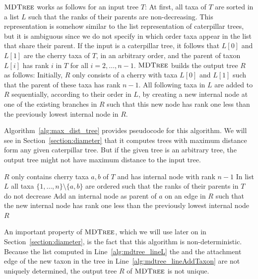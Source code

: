 \documentclass{amsart}
\newcommand{\mdtree}{\textsc{MDTree}}
\begin{document}
$\mdtree$ works as follows for an input tree $T$:
At first, all taxa of $T$ are sorted in a list $L$ such that the ranks of their parents are non-decreasing.
This representation is somehow similar to the list representation of caterpillar trees, but it is ambiguous since we do not specify in which order taxa appear in the list that share their parent.
If the input is a caterpillar tree, it follows that $L[0]$ and $L[1]$ are the cherry taxa of $T$, in an arbitrary order, and the parent of taxon $L[i]$ has rank $i$ in $T$ for all $i = 2, \ldots, n-1$.
$\mdtree$ builds the output tree $R$ as follows:
Initially, $R$ only consists of a cherry with taxa $L[0]$ and $L[1]$ such that the parent of these taxa has rank $n-1$.
All following taxa in $L$ are added to $R$ sequentially, according to their order in $L$, by creating a new internal node at one of the existing branches in $R$ such that this new node has rank one less than the previously lowest internal node in $R$.

Algorithm~\ref{alg:max_dist_tree} provides pseudocode for this algorithm.
We will see in Section~\ref{section:diameter} that it computes trees with maximum distance form any given caterpillar tree.
But if the given tree is an arbitrary tree, the output tree might not have maximum distance to the input tree.

\begin{algorithm}[H]
\caption{$\mdtree(T)$}
\label{alg:max_dist_tree}
\begin{algorithmic}[1]
	\STATE $R$ only contains cherry taxa $a, b$ of $T$ and has internal node with rank $n-1$
    \STATE In list $L$ all taxa $\{1,\ldots,n\}\setminus\{a,b\}$ are ordered such that the ranks of their parents in $T$ do not decrease \label{alg:mdtree_lineL}
		\STATE Add an internal node as parent of $a$ on an edge in $R$ such that the new internal node has rank one less than the previously lowest internal node \label{alg:mdtree_lineAddTaxon}
	\ENDFOR
	\RETURN $R$
\end{algorithmic}
\end{algorithm}

An important property of $\mdtree$, which we will use later on in Section~\ref{section:diameter}, is the fact that this algorithm is non-deterministic.
Because the list computed in Line~\ref{alg:mdtree_lineL} the and the attachment edge of the new taxon in the tree in Line~\ref{alg:mdtree_lineAddTaxon} are not uniquely determined, the output tree $R$ of $\mdtree$ is not unique.
\end{document}
